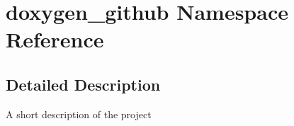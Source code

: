 \hypertarget{namespacedoxygen__github}{}\section{doxygen\+\_\+github Namespace Reference}
\label{namespacedoxygen__github}


\subsection{Detailed Description}
\begin{DoxyVerb}A short description of the project \end{DoxyVerb}
 